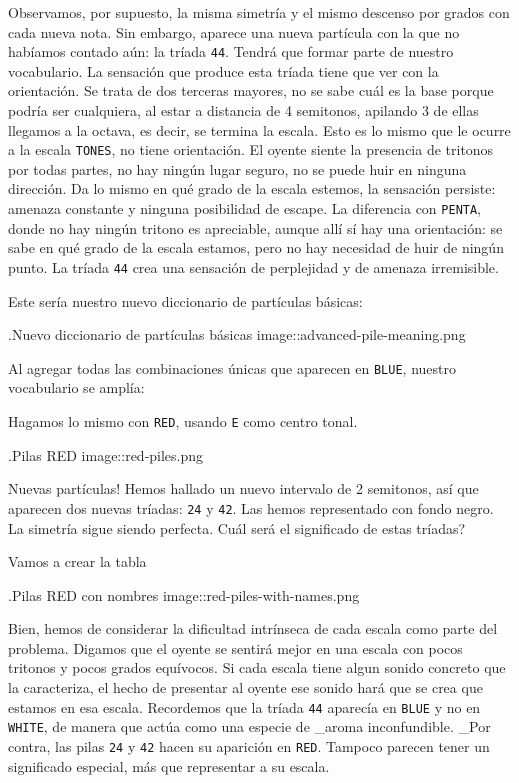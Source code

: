 \documentclass[]{article}
\begin{document}
Observamos, por supuesto, la misma simetría y el mismo descenso por grados con cada nueva nota. Sin embargo, aparece una nueva partícula con la que no habíamos contado aún: la tríada \texttt{44}. Tendrá que formar parte de nuestro vocabulario. La sensación que produce esta tríada tiene que ver con la orientación. Se trata de dos terceras mayores, no se sabe cuál es la base porque podría ser cualquiera, al estar a distancia de 4 semitonos, apilando 3 de ellas llegamos a la octava, es decir, se termina la escala. Esto es lo mismo que le ocurre a la escala \texttt{TONES}, no tiene orientación. El oyente siente la presencia de tritonos por todas partes, no hay ningún lugar seguro, no se puede huir en ninguna dirección. Da lo mismo en qué grado de la escala estemos, la sensación persiste: amenaza constante y ninguna posibilidad de escape. La diferencia con \texttt{PENTA}, donde no hay ningún tritono es apreciable, aunque allí sí hay una orientación: se sabe en qué grado de la escala estamos, pero no hay necesidad de huir de ningún punto. La tríada \texttt{44} crea una sensación de perplejidad y de amenaza irremisible.

Este sería nuestro nuevo diccionario de partículas básicas:

.Nuevo diccionario de partículas básicas image::advanced-pile-meaning.png

Al agregar todas las combinaciones únicas que aparecen en \texttt{BLUE}, nuestro vocabulario se amplía:

Hagamos lo mismo con \texttt{RED}, usando \texttt{E} como centro tonal.

.Pilas RED image::red-piles.png

Nuevas partículas! Hemos hallado un nuevo intervalo de 2 semitonos, así que aparecen dos nuevas tríadas: \texttt{24} y \texttt{42}. Las hemos representado con fondo negro. La simetría sigue siendo perfecta. Cuál será el significado de estas tríadas?

Vamos a crear la tabla

.Pilas RED con nombres image::red-piles-with-names.png

Bien, hemos de considerar la dificultad intrínseca de cada escala como parte del problema. Digamos que el oyente se sentirá mejor en una escala con pocos tritonos y pocos grados equívocos. Si cada escala tiene algun sonido concreto que la caracteriza, el hecho de presentar al oyente ese sonido hará que se crea que estamos en esa escala. Recordemos que la tríada \texttt{44} aparecía en \texttt{BLUE} y no en \texttt{WHITE}, de manera que actúa como una especie de \_aroma inconfundible. \_Por contra, las pilas \texttt{24} y \texttt{42} hacen su aparición en \texttt{RED}. Tampoco parecen tener un significado especial, más que representar a su escala.
\end{document}
